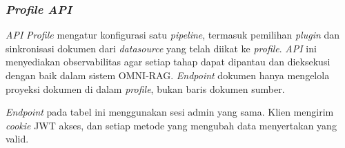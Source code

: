 \normalsize
\subsubsection{\emph{Profile API}}
\label{subsubsec:rancangan-api-profile}

\emph{API} \emph{Profile} mengatur konfigurasi satu \emph{pipeline}, termasuk pemilihan
\emph{plugin} dan sinkronisasi dokumen dari \emph{datasource} yang telah diikat ke
\emph{profile}. \emph{API} ini menyediakan observabilitas agar setiap tahap dapat dipantau
dan dieksekusi dengan baik dalam sistem OMNI-RAG. \emph{Endpoint} dokumen hanya
mengelola proyeksi dokumen di dalam \emph{profile}, bukan baris dokumen sumber.

\emph{Endpoint} pada tabel ini menggunakan sesi admin yang sama. Klien mengirim \emph{cookie} JWT
akses, dan setiap metode yang mengubah data menyertakan  yang valid.


